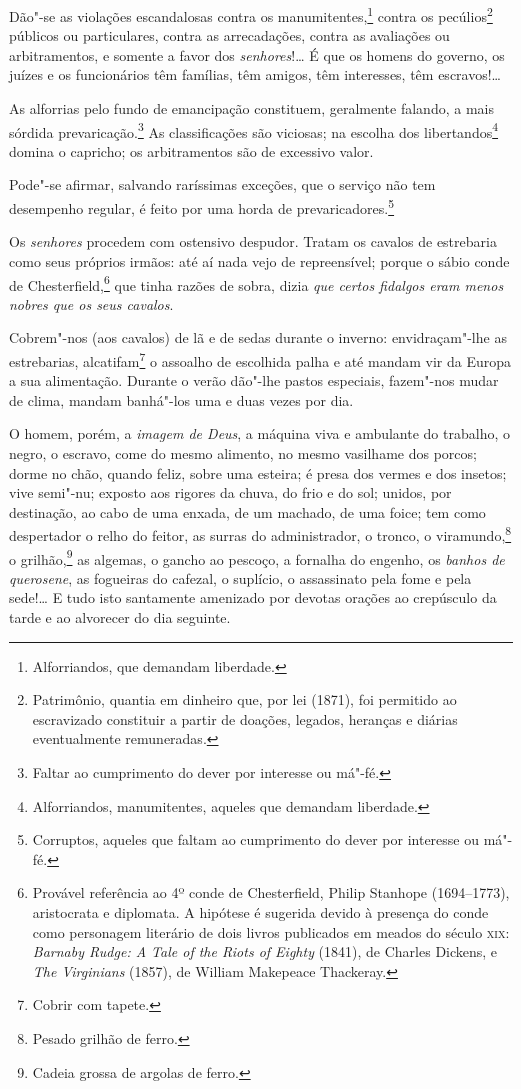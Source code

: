 Dão"-se as violações escandalosas contra os manumitentes,\footnote{
  Alforriandos, que demandam liberdade.} contra os pecúlios\footnote{
  Patrimônio, quantia em dinheiro que, por lei (1871), foi permitido ao
  escravizado constituir a partir de doações, legados, heranças e
  diárias eventualmente remuneradas.} públicos ou particulares, contra
as arrecadações, contra as avaliações ou arbitramentos, e somente a
favor dos \emph{senhores}!\ldots{} É que os homens do governo, os juízes e os
funcionários têm famílias, têm amigos, têm interesses, têm escravos!\ldots{}

As alforrias pelo fundo de emancipação constituem, geralmente falando, a mais sórdida
prevaricação.\footnote{
  Faltar ao cumprimento do dever por interesse ou má"-fé.} As
classificações são viciosas; na escolha dos libertandos\footnote{
  Alforriandos, manumitentes, aqueles que demandam liberdade.} domina o
capricho; os arbitramentos são de excessivo valor.

Pode"-se afirmar, salvando raríssimas exceções, que o serviço não tem
desempenho regular, é feito por uma horda de prevaricadores.\footnote{
  Corruptos, aqueles que   faltam ao cumprimento do dever por interesse ou má"-fé.}

Os \emph{senhores} procedem com ostensivo despudor. Tratam os cavalos de
estrebaria como seus próprios irmãos: até aí nada vejo de repreensível;
porque o sábio conde de Chesterfield,\footnote{Provável referência ao
 4º conde de Chesterfield, Philip Stanhope (1694--1773), aristocrata e
 diplomata. A hipótese é sugerida devido à presença do conde como
  personagem literário de dois livros publicados em meados do século
  \textsc{xix}: \emph{Barnaby Rudge: A Tale of the Riots of Eighty} (1841), de
  Charles Dickens, e \emph{The Virginians} (1857), de William Makepeace
  Thackeray.} que tinha razões de sobra, dizia \emph{que certos fidalgos
eram menos nobres que os seus cavalos}.

Cobrem"-nos (aos cavalos) de lã e de sedas durante o inverno:
envidraçam"-lhe as estrebarias, alcatifam\footnote{Cobrir com tapete.}
o assoalho de escolhida palha e até mandam vir da Europa a sua
alimentação. Durante o verão dão"-lhe pastos especiais, fazem"-nos mudar
de clima, mandam banhá"-los uma e duas vezes por dia.

O homem, porém, a \emph{imagem de Deus}, a máquina viva e ambulante do
trabalho, o negro, o escravo, come do mesmo alimento, no mesmo vasilhame
dos porcos; dorme no chão, quando feliz, sobre uma esteira; é presa dos
vermes e dos insetos; vive semi"-nu; exposto aos rigores da chuva, do
frio e do sol; unidos, por destinação, ao cabo de uma enxada, de um
machado, de uma foice; tem como despertador o relho do feitor, as surras
do administrador, o tronco, o viramundo,\footnote{Pesado grilhão de
  ferro.} o grilhão,\footnote{Cadeia grossa de argolas de ferro.} as
algemas, o gancho ao pescoço, a fornalha do engenho, os \emph{banhos de
querosene}, as fogueiras do cafezal, o suplício, o assassinato pela fome
e pela sede!\ldots{} E tudo isto santamente amenizado por devotas orações ao
crepúsculo da tarde e ao alvorecer do dia seguinte.

